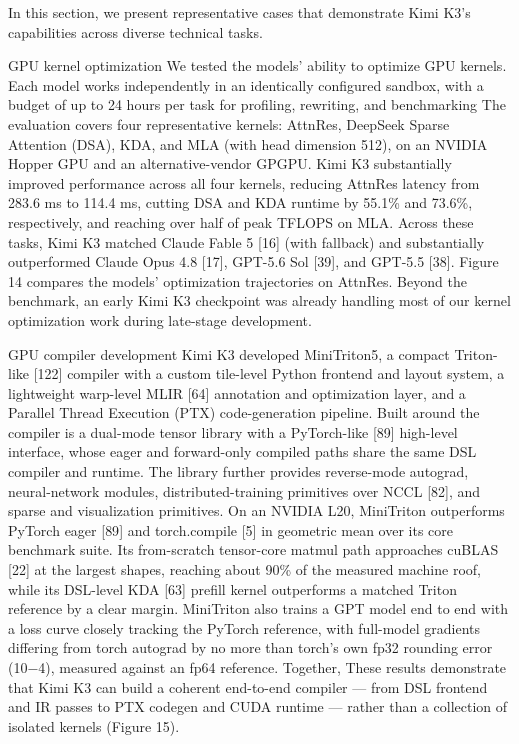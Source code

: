\documentclass[
  10
]{article}
\begin{document}
In this section, we present representative cases that demonstrate Kimi
K3's capabilities across diverse technical tasks.

GPU kernel optimization We tested the models' ability to optimize GPU
kernels. Each model works independently in an identically configured
sandbox, with a budget of up to 24 hours per task for profiling,
rewriting, and benchmarking The evaluation covers four representative
kernels: AttnRes, DeepSeek Sparse Attention (DSA), KDA, and MLA (with
head dimension 512), on an NVIDIA Hopper GPU and an alternative-vendor
GPGPU. Kimi K3 substantially improved performance across all four
kernels, reducing AttnRes latency from 283.6 ms to 114.4 ms, cutting DSA
and KDA runtime by 55.1\% and 73.6\%, respectively, and reaching over
half of peak TFLOPS on MLA. Across these tasks, Kimi K3 matched Claude
Fable 5 {[}16{]} (with fallback) and substantially outperformed Claude
Opus 4.8 {[}17{]}, GPT-5.6 Sol {[}39{]}, and GPT-5.5 {[}38{]}. Figure 14
compares the models' optimization trajectories on AttnRes. Beyond the
benchmark, an early Kimi K3 checkpoint was already handling most of our
kernel optimization work during late-stage development.

GPU compiler development Kimi K3 developed MiniTriton5, a compact
Triton-like {[}122{]} compiler with a custom tile-level Python frontend
and layout system, a lightweight warp-level MLIR {[}64{]} annotation and
optimization layer, and a Parallel Thread Execution (PTX)
code-generation pipeline. Built around the compiler is a dual-mode
tensor library with a PyTorch-like {[}89{]} high-level interface, whose
eager and forward-only compiled paths share the same DSL compiler and
runtime. The library further provides reverse-mode autograd,
neural-network modules, distributed-training primitives over NCCL
{[}82{]}, and sparse and visualization primitives. On an NVIDIA L20,
MiniTriton outperforms PyTorch eager {[}89{]} and torch.compile {[}5{]}
in geometric mean over its core benchmark suite. Its from-scratch
tensor-core matmul path approaches cuBLAS {[}22{]} at the largest
shapes, reaching about 90\% of the measured machine roof, while its
DSL-level KDA {[}63{]} prefill kernel outperforms a matched Triton
reference by a clear margin. MiniTriton also trains a GPT model end to
end with a loss curve closely tracking the PyTorch reference, with
full-model gradients differing from torch autograd by no more than
torch's own fp32 rounding error (10−4), measured against an fp64
reference. Together, These results demonstrate that Kimi K3 can build a
coherent end-to-end compiler --- from DSL frontend and IR passes to PTX
codegen and CUDA runtime --- rather than a collection of isolated
kernels (Figure 15).
\end{document}
